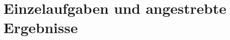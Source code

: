 \section{Einzelaufgaben und angestrebte Ergebnisse}
\label{sec:einzelaufgaben-und-angestrebte-ergebnisse}

{\color{red}
    \lipsum[1] %
}
